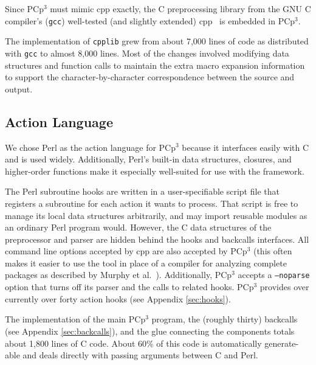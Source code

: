 \documentclass{article}
\newcommand{\pcp}{\mbox{\textsf{PCp}$^3$}}
\newcommand{\Cpp}{\mbox{\textsf{cpp}}}
\newcommand{\Perl}{\mbox{Perl}}
\newcommand{\C}{\mbox{C}}
\begin{document}
Since \pcp{} must mimic \Cpp{} exactly, the \C{}
preprocessing library from the GNU \C{} compiler's (\texttt{gcc})
well-tested (and slightly extended) \Cpp{}~\cite{GCC} is embedded in
\pcp{}.  


The implementation of \texttt{cpplib} grew from about 7,000 lines of
code as distributed with \texttt{gcc} to almost 8,000 lines.  Most of
the changes involved modifying data structures and function calls to
maintain the extra macro expansion information to support the
character-by-character correspondence between the source and output.

\subsection{Action Language}
\label{sec:perl_action_lang}

\nopagebreak

We chose \Perl{} as the action language for \pcp{} because it interfaces
easily with \C{} and is used widely.  Additionally, \Perl{}'s built-in
data structures, closures, and higher-order functions make it especially 
well-suited for use with the framework.

The \Perl{} subroutine hooks are written in a user-specifiable script
file that registers a subroutine for each action it wants to process.
That script is free to manage its local data structures arbitrarily, and
may import reusable modules as an ordinary \Perl{} program would.  However, the
\C{} data structures of the preprocessor and parser are hidden behind
the hooks and backcalls interfaces. All command line options accepted by
\Cpp{} are also accepted by \pcp{} (this often makes it easier to use
the tool in place of a compiler for analyzing complete packages as
described by Murphy et al.~\cite{Murphy98}).  Additionally, \pcp{}
accepts a \texttt{--noparse} option that turns off its parser and the
calls to related hooks.  \pcp{} provides over currently over forty action
hooks (see Appendix \ref{sec:hooks}).

The implementation of the main \pcp{} program, the (roughly thirty)
backcalls (see Appendix \ref{sec:backcalls}),
and the glue connecting the components totals about 1,800
lines of \C{} code.  About 60\% of this code is automatically
generate-able and deals directly with passing
arguments between \C{} and \Perl{}.
\end{document}
